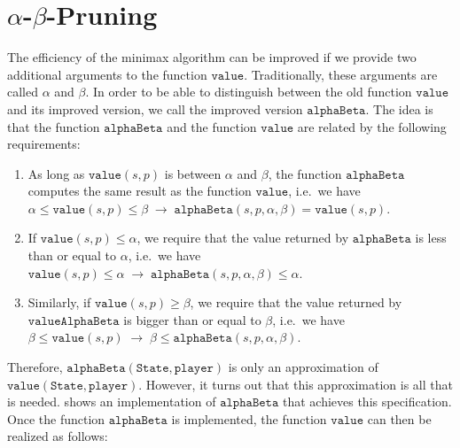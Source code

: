 \section{$\alpha$-$\beta$-Pruning}
The efficiency of the minimax algorithm can be improved if we provide two additional arguments to the function
$\texttt{value}$.  Traditionally, these arguments are called $\alpha$ and $\beta$.  In order to be able to
distinguish between the old function $\texttt{value}$ and its improved version, we call the improved version 
$\texttt{alphaBeta}$.  The idea is that the function $\texttt{alphaBeta}$ and the function $\texttt{value}$ are
related by the following requirements: 
\begin{enumerate}
\item As long as $\texttt{value}(s, p)$ is between $\alpha$ and $\beta$, the function
      $\texttt{alphaBeta}$ computes the same result as the function $\texttt{value}$,
      i.e.~we have
      \\[0.2cm]
      \hspace*{0.3cm}
      $\alpha \leq \texttt{value}(s, p) \leq \beta \;\rightarrow\;
         \texttt{alphaBeta}(s, p, \alpha, \beta) = \texttt{value}(s,p)
      $.
\item If $\texttt{value}(s, p) \leq \alpha$, we require that the value returned by
      $\texttt{alphaBeta}$ is less than or equal to $\alpha$, i.e.~we have 
      \\[0.2cm]
      \hspace*{0.3cm}
      $\texttt{value}(s, p) \leq \alpha \;\rightarrow\; \texttt{alphaBeta}(s, p, \alpha, \beta) \leq \alpha$.
\item Similarly, if $\texttt{value}(s, p) \geq \beta$, we require that the value
      returned by $\texttt{valueAlphaBeta}$ is bigger than or equal to $\beta$, i.e.~we have 
      \\[0.2cm]
      \hspace*{0.3cm}
      $\beta \leq \texttt{value}(s, p) \;\rightarrow\; \beta \leq \texttt{alphaBeta}(s, p, \alpha, \beta)$.
\end{enumerate}
Therefore, $\texttt{alphaBeta}(\texttt{State}, \texttt{player})$  is only an approximation of
$\texttt{value}(\texttt{State}, \texttt{player})$.  However, it turns out that this approximation is all that
is needed.   shows an implementation of $\texttt{alphaBeta}$ that achieves this
specification.  Once the function $\texttt{alphaBeta}$ is implemented, the function $\texttt{value}$ can then
be realized as follows: 
